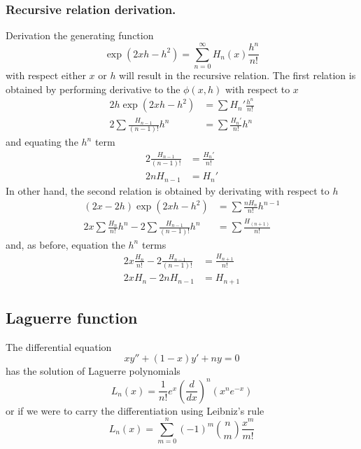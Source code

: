 \documentclass[../../../main.tex]{subfiles}
\begin{document}
\subsubsection{Recursive relation derivation.} 
Derivation the generating function
\begin{equation*}
    \exp(2xh-h^2)=\sum_{n=0}^{\infty}H_n(x)\frac{h^n}{n!}
\end{equation*}
with respect either $x$ or $h$ will result in the recursive relation.
The first relation is obtained by performing derivative to the $\phi(x,h)$ with respect to $x$
\begin{align*}
    2h\exp(2xh-h^2)&=\sum H_n'\frac{h^n}{n!}\\
    2\sum\frac{H_{n-1}}{(n-1)!}h^n&=\sum \frac{H_n'}{n!}h^n
\end{align*}
and equating the $h^n$ term 
\begin{align*}
    2\frac{H_{n-1}}{(n-1)!}&=\frac{H_n'}{n!}\\
    2nH_{n-1}&=H_n'
\end{align*}
In other hand, the second relation is obtained by derivating with respect to $h$
\begin{align*}
    (2x-2h)\exp(2xh-h^2)&=\sum\frac{nH_n}{n!}h^{n-1}\\
    2x\sum \frac{H_n}{n!}h^n-2 \sum \frac{H_{n-1}}{(n-1)!}h^n &=\sum \frac{H_(n+1)}{n!}
\end{align*}
and, as before, equation the $h^n$ terms 
\begin{align*}
    2x\frac{H_n}{n!}-2\frac{H_{n-1}}{(n-1)!}&=\frac{H_{n+1}}{n!}\\
    2xH_n-2nH_{n-1}&=H_{n+1}
\end{align*}

\subsection{Laguerre function}
The differential equation
\begin{equation*}
    xy''+(1-x)y'+ny=0
\end{equation*}
has the solution of Laguerre polynomials
\begin{equation*}
    L_n(x)=\frac{1}{n!}e^x\left(\frac{d}{dx}\right)^n(x^ne^{-x})
\end{equation*}
or if we were to carry the differentiation using Leibniz's rule
\begin{equation*}
    L_n(x)=\sum_{m=0}^{n}(-1)^m\binom{n}{m}\frac{x^m}{m!}
\end{equation*}
\end{document}
